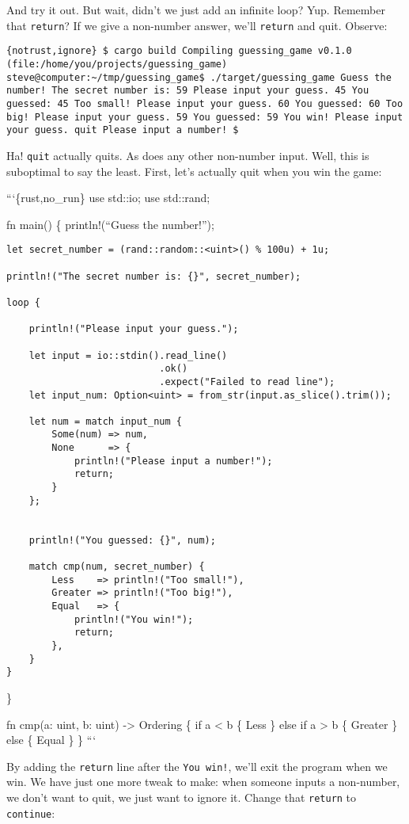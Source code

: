 \documentclass[]{article}
\begin{document}
And try it out. But wait, didn't we just add an infinite loop? Yup.
Remember that \texttt{return}? If we give a non-number answer, we'll
\texttt{return} and quit. Observe:

\texttt{\{notrust,ignore\} \$ cargo build    Compiling guessing\_game v0.1.0 (file:/home/you/projects/guessing\_game) steve@computer:\textasciitilde{}/tmp/guessing\_game\$ ./target/guessing\_game  Guess the number! The secret number is: 59 Please input your guess. 45 You guessed: 45 Too small! Please input your guess. 60 You guessed: 60 Too big! Please input your guess. 59 You guessed: 59 You win! Please input your guess. quit Please input a number! \$}

Ha! \texttt{quit} actually quits. As does any other non-number input.
Well, this is suboptimal to say the least. First, let's actually quit
when you win the game:

```\{rust,no\_run\} use std::io; use std::rand;

fn main() \{ println!(``Guess the number!'');

\begin{verbatim}
let secret_number = (rand::random::<uint>() % 100u) + 1u;

println!("The secret number is: {}", secret_number);

loop {

    println!("Please input your guess.");

    let input = io::stdin().read_line()
                           .ok()
                           .expect("Failed to read line");
    let input_num: Option<uint> = from_str(input.as_slice().trim());

    let num = match input_num {
        Some(num) => num,
        None      => {
            println!("Please input a number!");
            return;
        }
    };


    println!("You guessed: {}", num);

    match cmp(num, secret_number) {
        Less    => println!("Too small!"),
        Greater => println!("Too big!"),
        Equal   => {
            println!("You win!");
            return;
        },
    }
}
\end{verbatim}

\}

fn cmp(a: uint, b: uint) -\textgreater{} Ordering \{ if a \textless{} b
\{ Less \} else if a \textgreater{} b \{ Greater \} else \{ Equal \} \}
```

By adding the \texttt{return} line after the \texttt{You win!}, we'll
exit the program when we win. We have just one more tweak to make: when
someone inputs a non-number, we don't want to quit, we just want to
ignore it. Change that \texttt{return} to \texttt{continue}:
\end{document}

